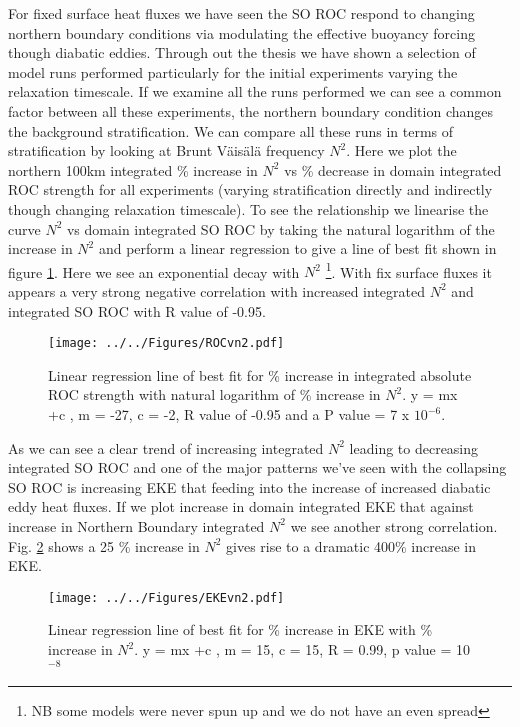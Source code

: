 For fixed surface heat fluxes we have seen the SO ROC respond to changing northern boundary conditions via modulating the effective buoyancy forcing though diabatic eddies. Through out the thesis we have shown a selection of model runs performed particularly for the initial experiments varying the relaxation timescale. If we examine all the runs performed we can see a common factor between all these experiments, the northern boundary condition changes the background stratification. We can compare all these runs in terms of stratification by looking at Brunt V{\"a}is\"al\"a  frequency $N^2$. Here we plot the northern 100km integrated \% increase in $N^2$ vs \% decrease in domain integrated ROC strength for all experiments (varying stratification directly and indirectly though changing relaxation timescale). To see the relationship we linearise the curve $N^2$ vs domain integrated SO ROC by taking the natural logarithm of the increase in $N^2$ and perform a linear regression to give a line of best fit shown in figure \ref{fig:n2vsroc}. Here we see an exponential decay with $N^2$ \footnote{NB some models were never spun up and we do not have an even spread}. With fix surface fluxes it appears a very strong negative correlation with increased integrated $N^2$ and integrated SO ROC with R value of -0.95. 

\begin{figure}[h]
\noindent \texttt{[image: ../../Figures/ROCvn2.pdf]}
\caption{Linear regression line of best fit for \% increase in integrated absolute ROC strength with natural logarithm of \% increase in $N^2$. y = mx +c , m = -27, c = -2, R value of -0.95 and a P value = 7 x $10^{-6}$.}
\label{fig:n2vsroc}
\end{figure}

As we can see a clear trend of increasing integrated $N^2$ leading to decreasing integrated SO ROC and one of the major patterns we've seen with the collapsing SO ROC is increasing EKE that feeding into the increase of increased diabatic eddy heat fluxes. If we plot increase in domain integrated EKE that against increase in Northern Boundary integrated $N^2$ we see another strong correlation. Fig. \ref{fig:n2vseke} shows a 25 \% increase in $N^2$ gives rise to a dramatic 400\% increase in EKE. 

\begin{figure}[h]
\noindent \texttt{[image: ../../Figures/EKEvn2.pdf]}
\caption{Linear regression line of best fit for \% increase in EKE with \% increase in $N^2$. y = mx +c , m = 15, c = 15, R = 0.99, p value = 10$^{-8}$}
\label{fig:n2vseke}
\end{figure}

